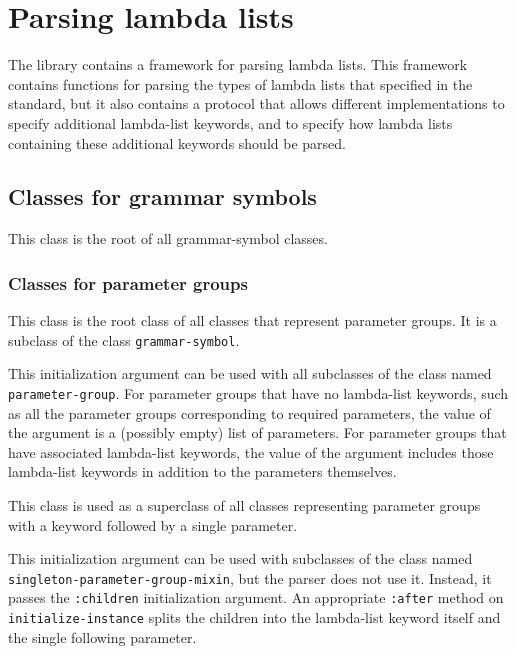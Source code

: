 \chapter{Parsing lambda lists}
\label{chap-user-parsing-lambda-lists}

The \sysname{} library contains a framework for parsing lambda lists.
This framework contains functions for parsing the types of lambda
lists that specified in the \commonlisp{} standard, but it also
contains a protocol that allows different implementations to specify
additional lambda-list keywords, and to specify how lambda lists
containing these additional keywords should be parsed.

\section{Classes for grammar symbols}


This class is the root of all grammar-symbol classes.

\subsection{Classes for parameter groups}
\label{sec-parsing-lambda-lists-parameter-groups}


This class is the root class of all classes that represent parameter
groups.  It is a subclass of the class \texttt{grammar-symbol}.


This initialization argument can be used with all subclasses of the
class named \texttt{parameter-group}.  For parameter groups that have
no lambda-list keywords, such as all the parameter groups
corresponding to required parameters, the value of the argument is a
(possibly empty) list of parameters.  For parameter groups that have
associated lambda-list keywords, the value of the argument includes
those lambda-list keywords in addition to the parameters themselves.


This class is used as a superclass of all classes representing
parameter groups with a keyword followed by a single parameter.


This initialization argument can be used with subclasses of the class
named \texttt{singleton-parameter-group-mixin}, but the parser does
not use it.  Instead, it passes the \texttt{:children} initialization
argument.  An appropriate \texttt{:after} method on
\texttt{initialize-instance} splits the children into the lambda-list
keyword itself and the single following parameter.

